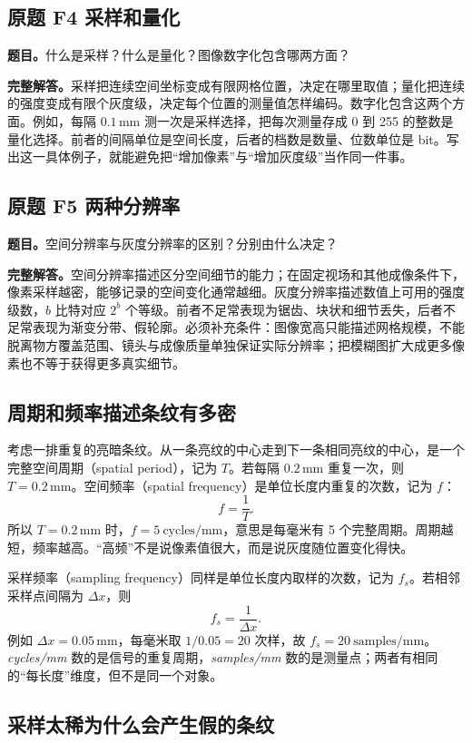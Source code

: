 \subsection*{原题 F4 采样和量化}
\label{original:F4}
\textbf{题目。}什么是采样？什么是量化？图像数字化包含哪两方面？

\textbf{完整解答。}采样把连续空间坐标变成有限网格位置，决定在哪里取值；量化把连续的强度变成有限个灰度级，决定每个位置的测量值怎样编码。数字化包含这两个方面。例如，每隔 $0.1\,\mathrm{mm}$ 测一次是采样选择，把每次测量存成 0 到 255 的整数是量化选择。前者的间隔单位是空间长度，后者的档数是数量、位数单位是 bit。写出这一具体例子，就能避免把“增加像素”与“增加灰度级”当作同一件事。

\subsection*{原题 F5 两种分辨率}
\label{original:F5}
\textbf{题目。}空间分辨率与灰度分辨率的区别？分别由什么决定？

\textbf{完整解答。}空间分辨率描述区分空间细节的能力；在固定视场和其他成像条件下，像素采样越密，能够记录的空间变化通常越细。灰度分辨率描述数值上可用的强度级数，$b$ 比特对应 $2^b$ 个等级。前者不足常表现为锯齿、块状和细节丢失，后者不足常表现为渐变分带、假轮廓。必须补充条件：图像宽高只能描述网格规模，不能脱离物方覆盖范围、镜头与成像质量单独保证实际分辨率；把模糊图扩大成更多像素也不等于获得更多真实细节。

\subsection{周期和频率描述条纹有多密}

考虑一排重复的亮暗条纹。从一条亮纹的中心走到下一条相同亮纹的中心，是一个完整空间周期（spatial period），记为 $T$。若每隔 $0.2\,\mathrm{mm}$ 重复一次，则 $T=0.2\,\mathrm{mm}$。空间频率（spatial frequency）是单位长度内重复的次数，记为 $f$：
\[
  f=\frac{1}{T}.
\]
所以 $T=0.2\,\mathrm{mm}$ 时，$f=5\ \mathrm{cycles/mm}$，意思是每毫米有 5 个完整周期。周期越短，频率越高。“高频”不是说像素值很大，而是说灰度随位置变化得快。

采样频率（sampling frequency）同样是单位长度内取样的次数，记为 $f_s$。若相邻采样点间隔为 $\Delta x$，则
\[
  f_s=\frac{1}{\Delta x}.
\]
例如 $\Delta x=0.05\,\mathrm{mm}$，每毫米取 $1/0.05=20$ 次样，故 $f_s=20\ \mathrm{samples/mm}$。\emph{cycles/mm} 数的是信号的重复周期，\emph{samples/mm} 数的是测量点；两者有相同的“每长度”维度，但不是同一个对象。

\subsection{采样太稀为什么会产生假的条纹}

